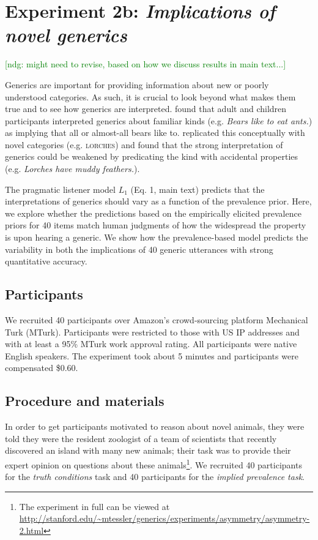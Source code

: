 \documentclass[10pt,letterpaper]{article}
\newcommand{\ndg}[1]{\textcolor{Green}{[ndg: #1]}}
\begin{document}
\section{Experiment 2b: \emph{Implications of novel generics}}

\ndg{might need to revise, based on how we discuss results in main text...}

Generics are important for providing information about new or poorly understood categories.
As such, it is crucial to look beyond what makes them true and to see how generics are interpreted.
 found that adult and children participants interpreted generics about familiar kinds (e.g. \emph{Bears like to eat ants.}) as implying that all or almost-all bears like to.
 replicated this conceptually with novel categories (e.g. \textsc{lorches}) and found that the strong interpretation of generics could be weakened by predicating the kind with accidental properties (e.g. \emph{Lorches have muddy feathers.}).

The pragmatic listener model $L_1$ (Eq. 1, main text) predicts that the interpretations of generics should vary as a function of the prevalence prior.
Here, we explore whether the predictions based on the empirically elicited prevalence priors for 40 items match human judgments of how the widespread the property is upon hearing a generic.
We show how the prevalence-based model predicts the variability in both the implications of 40 generic utterances with strong quantitative accuracy.

\subsection{Participants}

We recruited 40 participants over Amazon's crowd-sourcing platform Mechanical Turk (MTurk).  
Participants were restricted to those with US IP addresses and with at least a 95\% MTurk work approval rating. 
All participants were native English speakers. 
The experiment took about 5 minutes and participants were compensated \$0.60.

\subsection{Procedure and materials}
\label{sec:interpretationsMaterials}

In order to get participants motivated to reason about novel animals, they were told they were the resident zoologist of a team of scientists that recently discovered an island with many new animals; their task was to provide their expert opinion on questions about these animals\footnote{The experiment in full can be viewed at \url{http://stanford.edu/~mtessler/generics/experiments/asymmetry/asymmetry-2.html}}. 
We recruited 40 participants for the \emph{truth conditions} task and 40 participants for the \emph{implied prevalence task}. 
\end{document}
